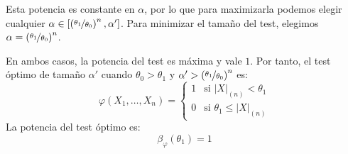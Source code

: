 \begin{ejercicio}
\begin{description}
\begin{description}
\begin{itemize}
                Esta potencia es constante en $\alpha$, por lo que para maximizarla podemos elegir cualquier $\alpha\in \left[\left(\nicefrac{\theta_1}{\theta_0}\right)^n,\alpha'\right]$. Para minimizar el tamaño del test, elegimos $\alpha = \left(\nicefrac{\theta_1}{\theta_0}\right)^n$.
            \end{itemize}

            En ambos casos, la potencia del test es máxima y vale $1$. Por tanto, el test óptimo de tamaño $\alpha'$ cuando $\theta_0 > \theta_1$ y $\alpha' > \left(\nicefrac{\theta_1}{\theta_0}\right)^n$ es:
            \begin{equation*}
                \varphi(X_1, \ldots, X_n) = \left\{\begin{array}{ll}
                    1 & \text{si\ } |X|_{(n)} < \theta_1 \\
                    0 & \text{si\ } \theta_1 \leq |X|_{(n)}
                \end{array}\right.
            \end{equation*}
            La potencia del test óptimo es:
            \begin{equation*}
                \beta_\varphi(\theta_1) = 1
            \end{equation*}
        \end{description}
    \end{description}
\end{ejercicio}

